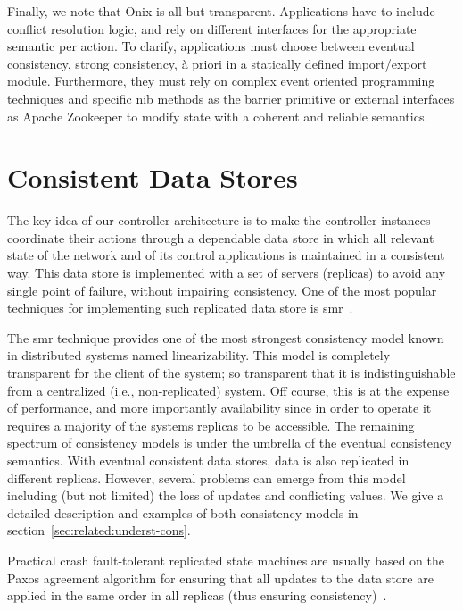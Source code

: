 Finally, we note that Onix is all but transparent. 
Applications have to include conflict resolution logic, and rely on different interfaces for the appropriate semantic per action. 
To clarify, applications must choose between eventual consistency, strong consistency, à priori in a statically defined import/export module. 
Furthermore, they must rely on complex event oriented programming techniques and specific \gls{nib} methods as the barrier primitive or external interfaces as Apache Zookeeper to modify state with a coherent and reliable semantics. 

\glsresetall
\section{Consistent Data Stores}
\label{sec:related:cons-data-stor}
The key idea of our controller architecture is to make the controller instances coordinate their actions through a dependable data store in which all relevant state of the network and of its control applications is maintained in a consistent way.
This data store is implemented with a set of servers (replicas) to avoid any single point of failure, without impairing consistency.
One of the most popular techniques for implementing such replicated data store is \gls{smr}~\cite{Schneider:1990vy,Lam98}.

The  \gls{smr} technique provides one of the most strongest consistency model known in distributed systems named linearizability. 
This model is completely transparent for the client of the system; so transparent that it is indistinguishable from a centralized (i.e., non-replicated) system. 
Off course, this is at the expense of performance, and more importantly availability since in order to operate it requires a majority of the systems replicas to be accessible. 
The remaining spectrum of consistency models is under the umbrella of the eventual consistency semantics. 
With eventual consistent data stores, data is also replicated in different replicas. 
However, several problems can emerge from this model including (but not limited) the loss of updates and  conflicting values. 
We give a detailed description and examples of both consistency models in section~\ref{sec:related:underst-cons}.

Practical crash fault-tolerant replicated state machines are usually based on the Paxos agreement algorithm for ensuring that all updates to the data store are applied in the same order in all replicas (thus ensuring consistency)~\cite{Lam98}. 


